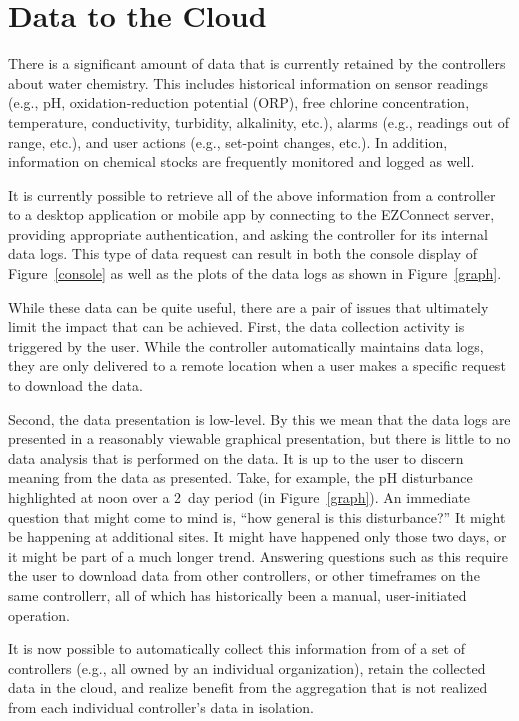 \section{Data to the Cloud}
\label{sec:cloud}

There is a significant amount of data that is currently retained by
the controllers about water chemistry.  This includes historical
information on sensor readings (e.g., pH, oxidation-reduction potential (ORP),
free chlorine concentration, temperature, conductivity, turbidity,
alkalinity, etc.),
alarms (e.g., readings out of range, etc.), and user actions (e.g.,
set-point changes, etc.).
In addition, information on chemical stocks are frequently monitored
and logged as well.

It is currently possible to retrieve all of the above information from
a controller to a desktop application or mobile app by connecting to
the EZConnect server, providing appropriate authentication, and asking
the controller for its internal data logs.
This type of data request can result in both the console display of
Figure~\ref{console} as well as the plots of the data logs as shown
in Figure~\ref{graph}.

While these data can be quite useful, there are a pair of issues that
ultimately limit the impact that can be achieved.  First, the data
collection activity is triggered by the user.  While the controller
automatically maintains data logs, they are only delivered to a remote
location when a user makes a specific request to download the data.

Second, the data presentation is low-level.  By this we mean that
the data logs are presented in a reasonably viewable graphical presentation,
but there is little to no data analysis that is performed on the data.
It is up to the user to discern meaning from the data as presented.
Take, for example, the pH disturbance highlighted at noon over a 2~day
period (in Figure~\ref{graph}).  An immediate question that might come
to mind is, ``how general is this disturbance?'' It might be happening
at additional sites.  It might have happened only those two days, or it
might be part of a much longer trend.  Answering questions such as this require
the user to download data from other controllers, or other timeframes
on the same controllerr, all of which has historically been a manual,
user-initiated operation.

It is now possible to automatically
collect this information from of a set of controllers (e.g., all
owned by an individual organization), retain the collected data in
the cloud, and realize benefit from the aggregation that is not realized
from each individual controller's data in isolation.

